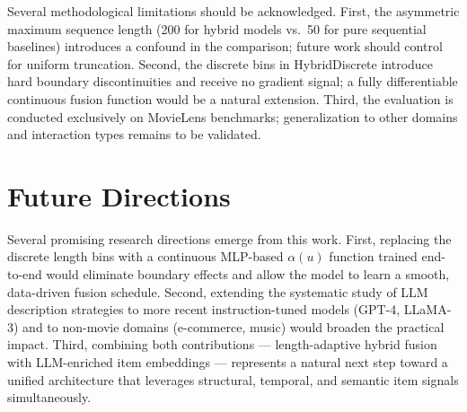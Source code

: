 \documentclass[12pt,a4paper]{report}
\begin{document}
Several methodological limitations should be acknowledged. First, the asymmetric maximum sequence length (200 for hybrid models vs.\ 50 for pure sequential baselines) introduces a confound in the comparison; future work should control for uniform truncation. Second, the discrete bins in HybridDiscrete introduce hard boundary discontinuities and receive no gradient signal; a fully differentiable continuous fusion function would be a natural extension. Third, the evaluation is conducted exclusively on MovieLens benchmarks; generalization to other domains and interaction types remains to be validated.

\section*{Future Directions}

Several promising research directions emerge from this work. First, replacing the discrete length bins with a continuous MLP-based $\alpha(u)$ function trained end-to-end would eliminate boundary effects and allow the model to learn a smooth, data-driven fusion schedule. Second, extending the systematic study of LLM description strategies to more recent instruction-tuned models (GPT-4, LLaMA-3) and to non-movie domains (e-commerce, music) would broaden the practical impact. Third, combining both contributions --- length-adaptive hybrid fusion with LLM-enriched item embeddings --- represents a natural next step toward a unified architecture that leverages structural, temporal, and semantic item signals simultaneously.

\newpage

\end{document}
